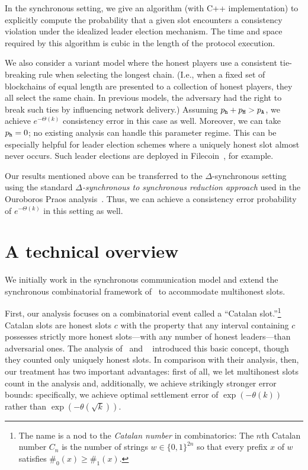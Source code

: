 In the synchronous setting, 
we give an algorithm (with C++ implementation) to explicitly compute the probability 
that a given slot encounters a consistency violation 
under the idealized leader election mechanism. 
The time and space required by this algorithm is cubic 
in the length of the protocol execution.

We also consider a variant model where the honest players use a
consistent tie-breaking rule when selecting the longest chain.  (I.e.,
when a fixed set of blockchains of equal length are presented to a
collection of honest players, they all select the same chain.
In previous models, the adversary had the right to break such ties by influencing
network delivery.)
Assuming $p_{\mathtt{h}} + p_{\mathtt{H}} > p_{\mathtt{A}}$, we achieve 
$e^{-\Theta(k)}$ consistency error in this case as well. 
Moreover, we can take $p_{\mathtt{h}} =0$; 
no existing analysis can handle this parameter regime. 
This can be especially helpful for leader election schemes
where a uniquely honest slot almost never occurs. 
Such leader elections are deployed in Filecoin~\cite{Filecoin}, for example.


Our results mentioned above can be transferred to
the $\Delta$-synchronous setting using the standard 
\emph{$\Delta$-synchronous to synchronous reduction
approach} used in the Ouroboros Praos analysis~\cite{Praos}. Thus, we
can achieve a consistency error probability of $e^{-\Theta(k)}$ in this
setting as well. 




\section{A technical overview}
We initially work in the synchronous communication model and extend
the synchronous combinatorial framework
of~\cite{LinearConsistency} to accommodate multihonest
slots. 

First, our analysis focuses on a combinatorial event called a ``Catalan
slot.''\footnote{The name is a nod to the \emph{Catalan number} in
  combinatorics: The $n$th Catalan number $C_n$ is the number of
  strings $w \in \{0, 1\}^{2n}$ so that every prefix $x$ of $w$
  satisfies $\#_0(x) \geq \#_1(x)$.} Catalan slots are honest slots
$c$ with the property that any interval containing $c$ possesses
strictly more honest slots---with any number of honest leaders---than
adversarial ones. The analysis of~\cite{SnowWhite} and ~\cite{Sleepy}
introduced this basic concept, though they counted only uniquely
honest slots. In comparison with their analysis, then, our treatment
has two important advantages: first of all, we let multihonest
slots count in the analysis and, additionally, we achieve strikingly
stronger error bounds: specifically, we achieve optimal settlement
error of $\exp(-\theta(k))$ rather than $\exp(-\theta(\sqrt{k}))$.

